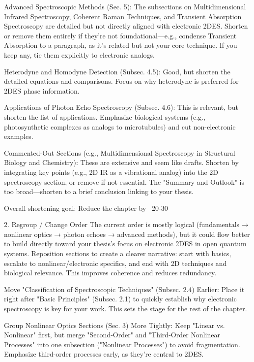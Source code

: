 {Advanced Spectroscopic Methods (Sec. 5): The subsections on Multidimensional Infrared Spectroscopy, Coherent Raman Techniques, and Transient Absorption Spectroscopy are detailed but not directly aligned with electronic 2DES. Shorten or remove them entirely if they're not foundational—e.g., condense Transient Absorption to a paragraph, as it's related but not your core technique. If you keep any, tie them explicitly to electronic analogs.

Heterodyne and Homodyne Detection (Subsec. 4.5): Good, but shorten the detailed equations and comparisons. Focus on why heterodyne is preferred for 2DES phase information.

Applications of Photon Echo Spectroscopy (Subsec. 4.6): This is relevant, but shorten the list of applications. Emphasize biological systems (e.g., photosynthetic complexes as analogs to microtubules) and cut non-electronic examples.

Commented-Out Sections (e.g., Multidimensional Spectroscopy in Structural Biology and Chemistry): These are extensive and seem like drafts. Shorten by integrating key points (e.g., 2D IR as a vibrational analog) into the 2D spectroscopy section, or remove if not essential. The "Summary and Outlook" is too broad—shorten to a brief conclusion linking to your thesis.

Overall shortening goal: Reduce the chapter by ~20-30%

2. Regroup / Change Order
The current order is mostly logical (fundamentals → nonlinear optics → photon echoes → advanced methods), but it could flow better to build directly toward your thesis's focus on electronic 2DES in open quantum systems. Reposition sections to create a clearer narrative: start with basics, escalate to nonlinear/electronic specifics, and end with 2D techniques and biological relevance. This improves coherence and reduces redundancy.

Move "Classification of Spectroscopic Techniques" (Subsec. 2.4) Earlier: Place it right after "Basic Principles" (Subsec. 2.1) to quickly establish why electronic spectroscopy is key for your work. This sets the stage for the rest of the chapter.

Group Nonlinear Optics Sections (Sec. 3) More Tightly: Keep "Linear vs. Nonlinear" first, but merge "Second-Order" and "Third-Order Nonlinear Processes" into one subsection ("Nonlinear Processes") to avoid fragmentation. Emphasize third-order processes early, as they're central to 2DES.

}
